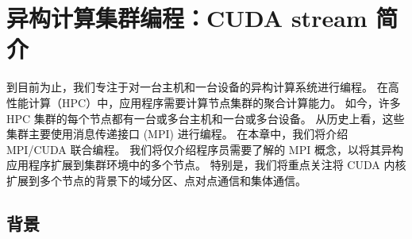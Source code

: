 \section{异构计算集群编程：CUDA stream 简介}
到目前为止，我们专注于对一台主机和一台设备的异构计算系统进行编程。 在高性能计算（HPC）中，应用程序需要计算节点集群的聚合计算能力。 如今，许多 HPC 集群的每个节点都有一台或多台主机和一台或多台设备。 从历史上看，这些集群主要使用消息传递接口 (MPI) 进行编程。 在本章中，我们将介绍 MPI/CUDA 联合编程。 我们将仅介绍程序员需要了解的 MPI 概念，以将其异构应用程序扩展到集群环境中的多个节点。 特别是，我们将重点关注将 CUDA 内核扩展到多个节点的背景下的域分区、点对点通信和集体通信。

\subsection{背景}